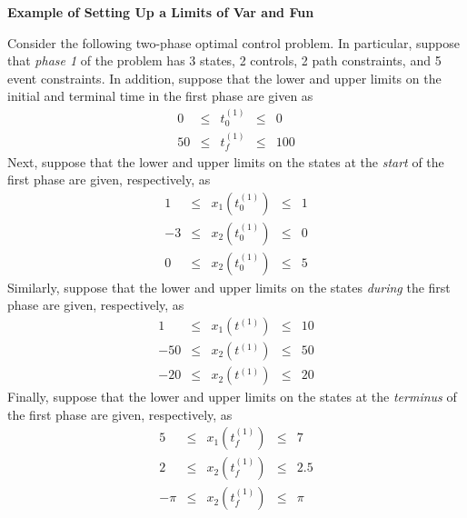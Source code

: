 \documentclass[10pt]{article}
\begin{document}
    \textbf {Example of Setting Up a Limits of Var and Fun}
    	
    	Consider the following two-phase optimal control problem.  In
    	particular, suppose that {\em phase 1} of the problem has 3 states, 2
    	controls, 2 path constraints, and 5 event constraints. In addition, suppose that the lower and upper limits on
    	the initial and terminal time in the first phase are given as
    	\begin{displaymath}
    	\begin{array}{rcccr}
    	0 & \leq  & t_0^{(1)} & \leq & 0 \\
    	50 & \leq & t_f^{(1)} & \leq & 100
    	\end{array}
    	\end{displaymath}
    	Next, suppose that the lower and upper limits on the states at the
    	{\em start} of the first phase are given, respectively, as
    	\begin{displaymath}
    	\begin{array}{rcccr}
    	1 & \leq & x_1(t_0^{(1)}) & \leq & 1 \\
    	-3 & \leq & x_2(t_0^{(1)}) & \leq & 0 \\
    	0 & \leq & x_2(t_0^{(1)}) & \leq & 5
    	\end{array}
    	\end{displaymath}
    	Similarly, suppose that the lower and upper limits on the states
    	{\em during}  the first phase are given, respectively, as
    	\begin{displaymath}
    	\begin{array}{rcccr}
    	1 & \leq & x_1(t^{(1)}) & \leq & 10 \\
    	-50 & \leq & x_2(t^{(1)}) & \leq & 50 \\
    	-20 & \leq & x_2(t^{(1)}) & \leq & 20
    	\end{array}
    	\end{displaymath}
    	Finally, suppose that the lower and upper limits on the states at the
    	{\em terminus} of the first phase are given, respectively, as
    	\begin{displaymath}
    	\begin{array}{rcccr}
    	5 & \leq & x_1(t_f^{(1)}) & \leq & 7 \\
    	2 & \leq & x_2(t_f^{(1)}) & \leq & 2.5 \\
    	-\pi & \leq & x_2(t_f^{(1)}) & \leq & \pi
    	\end{array}
    	\end{displaymath}
\end{document}
